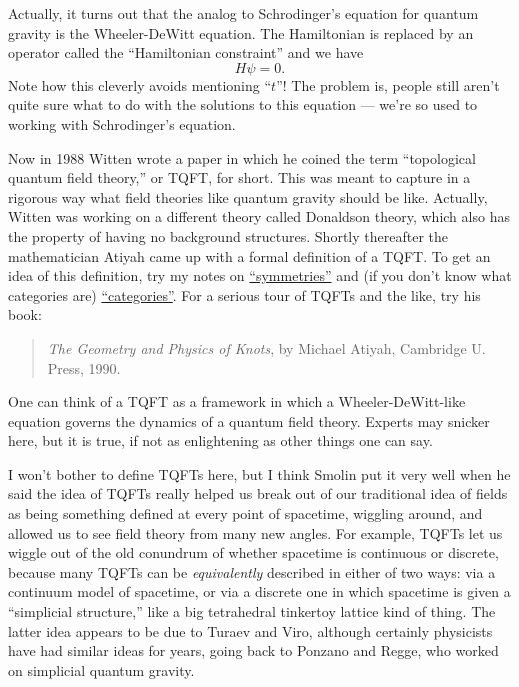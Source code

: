 \documentclass{article}
\begin{document}
Actually, it turns out that the analog to Schrodinger's equation for
quantum gravity is the Wheeler-DeWitt equation. The Hamiltonian is
replaced by an operator called the ``Hamiltonian constraint'' and we
have \[H\psi = 0.\] Note how this cleverly avoids mentioning ``\(t\)''!
The problem is, people still aren't quite sure what to do with the
solutions to this equation --- we're so used to working with
Schrodinger's equation.

Now in 1988 Witten wrote a paper in which he coined the term
``topological quantum field theory,'' or TQFT, for short. This was meant
to capture in a rigorous way what field theories like quantum gravity
should be like. Actually, Witten was working on a different theory
called Donaldson theory, which also has the property of having no
background structures. Shortly thereafter the mathematician Atiyah came
up with a formal definition of a TQFT. To get an idea of this
definition, try my notes on
\href{http://math.ucr.edu/home/baez/symmetries.html}{``symmetries''} and
(if you don't know what categories are)
\href{http://math.ucr.edu/home/baez/categories.html}{``categories''}.
For a serious tour of TQFTs and the like, try his book:

\begin{quote}
\emph{The Geometry and Physics of Knots}, by Michael Atiyah, Cambridge
U. Press, 1990.
\end{quote}

One can think of a TQFT as a framework in which a Wheeler-DeWitt-like
equation governs the dynamics of a quantum field theory. Experts may
snicker here, but it is true, if not as enlightening as other things one
can say.

I won't bother to define TQFTs here, but I think Smolin put it very well
when he said the idea of TQFTs really helped us break out of our
traditional idea of fields as being something defined at every point of
spacetime, wiggling around, and allowed us to see field theory from many
new angles. For example, TQFTs let us wiggle out of the old conundrum of
whether spacetime is continuous or discrete, because many TQFTs can be
\emph{equivalently} described in either of two ways: via a continuum
model of spacetime, or via a discrete one in which spacetime is given a
``simplicial structure,'' like a big tetrahedral tinkertoy lattice kind
of thing. The latter idea appears to be due to Turaev and Viro, although
certainly physicists have had similar ideas for years, going back to
Ponzano and Regge, who worked on simplicial quantum gravity.
\end{document}
